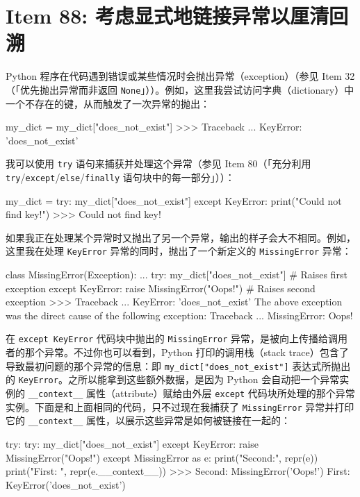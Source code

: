 \section{Item 88: 考虑显式地链接异常以厘清回溯}

Python 程序在代码遇到错误或某些情况时会抛出异常（exception）（参见 Item 32（「优先抛出异常而非返回 \texttt{None}」））。例如，这里我尝试访问字典（dictionary）中一个不存在的键，从而触发了一次异常的抛出：

\begin{codebox}[python]
my_dict = {}
my_dict["does_not_exist"]
>>>
Traceback ...
KeyError: 'does_not_exist'
\end{codebox}

我可以使用 \texttt{try} 语句来捕获并处理这个异常（参见 Item 80（「充分利用 \texttt{try}/\texttt{except}/\texttt{else}/\texttt{finally} 语句块中的每一部分」））：

\begin{codebox}[python]
my_dict = {}
try:
    my_dict["does_not_exist"]
except KeyError:
    print("Could not find key!")
>>>
Could not find key!
\end{codebox}

如果我正在处理某个异常时又抛出了另一个异常，输出的样子会大不相同。例如，这里我在处理 \texttt{KeyError} 异常的同时，抛出了一个新定义的 \texttt{MissingError} 异常：

\begin{codebox}[python]
class MissingError(Exception):
    ...
try:
    my_dict["does_not_exist"]    # Raises first exception
except KeyError:
    raise MissingError("Oops!")  # Raises second exception
>>>
Traceback ...
KeyError: 'does_not_exist'
The above exception was the direct cause of the following
exception:
Traceback ...
MissingError: Oops!
\end{codebox}

在 \texttt{except KeyError} 代码块中抛出的 \texttt{MissingError} 异常，是被向上传播给调用者的那个异常。不过你也可以看到，Python 打印的调用栈（stack trace）包含了导致最初问题的那个异常的信息：即 \texttt{my\_dict["does\_not\_exist"]} 表达式所抛出的 \texttt{KeyError}。之所以能拿到这些额外数据，是因为 Python 会自动把一个异常实例的 \texttt{\_\_context\_\_} 属性（attribute）赋给由外层 \texttt{except} 代码块所处理的那个异常实例。下面是和上面相同的代码，只不过现在我捕获了 \texttt{MissingError} 异常并打印它的 \texttt{\_\_context\_\_} 属性，以展示这些异常是如何被链接在一起的：

\begin{codebox}[python]
try:
    try:
        my_dict["does_not_exist"]
    except KeyError:
        raise MissingError("Oops!")
except MissingError as e:
    print("Second:", repr(e))
    print("First: ", repr(e.__context__))
>>>
Second: MissingError('Oops!')
First:  KeyError('does_not_exist')
\end{codebox}

